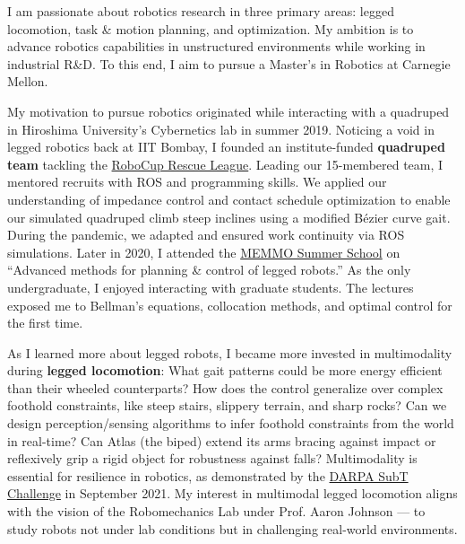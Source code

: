 \documentclass[12pt]{article}
\newcommand{\makefootnotelist}[1]{%
	\parbox{0.8\textwidth} {%
		\footnotesize{%
			\renewcommand*{\do}[1]{##1\\}%
			\dolistcsloop{#1}}}}%
\newcommand{\fancyfootnote}[1]{%
	\footnotemark{}%
	\def\listname{footlist\thepage}%
	\def\n{$^{\the\numexpr\value{footnote}}$}
	\ifcsdef{\listname}%
	{\listcseadd{\listname}{\n\ #1}}%
	{\csedef{\listname}{}%
		\listcseadd{\listname}{\n\ #1}}%
	\fancypagestyle{fancyfootnote}{%
		\fancyfoot[L]{\makefootnotelist{\listname}}%
		\fancyfoot[R]{Page \thepage}%
		\fancyfoot[C]{}%
	}\thispagestyle{fancyfootnote}}%
\begin{document}



I am passionate about robotics research in three primary areas: legged locomotion, task \& motion planning, and optimization. My ambition is to advance robotics capabilities in unstructured environments while working in industrial R\&D. To this end, I aim to pursue a Master’s in Robotics at Carnegie Mellon.

My motivation to pursue robotics originated while interacting with a quadruped in Hiroshima University’s Cybernetics lab in summer 2019. Noticing a void in legged robotics back at IIT Bombay, I founded an institute-funded \textbf{quadruped team} tackling the \href{https://rrl.robocup.org/}{RoboCup Rescue League}. Leading our 15-membered team, I mentored recruits with ROS and programming skills. We applied our understanding of impedance control and contact schedule optimization to enable our simulated quadruped climb steep inclines using a modified Bézier curve gait. During the pandemic, we adapted and ensured work continuity via ROS simulations. Later in 2020, I attended the \href{https://memory-of-motion.github.io/summer-school/}{MEMMO Summer School} on “Advanced methods for planning \& control of legged robots.” As the only undergraduate, I enjoyed interacting with graduate students. The lectures exposed me to Bellman’s equations, collocation methods, and optimal control for the first time.

As I learned more about legged robots, I became more invested in multimodality during \textbf{legged locomotion}: What gait patterns could be more energy efficient than their wheeled counterparts? How does the control generalize over complex foothold constraints, like steep stairs, slippery terrain, and sharp rocks? Can we design perception/sensing algorithms to infer foothold constraints from the world in real-time? Can Atlas (the biped) extend its arms bracing against impact or reflexively grip a rigid object for robustness against falls? Multimodality is essential for resilience in robotics, as demonstrated by the \href{https://www.darpa.mil/program/darpa-subterranean-challenge}{DARPA SubT Challenge} in September 2021. My interest in multimodal legged locomotion aligns with the vision of the Robomechanics Lab under Prof. Aaron Johnson — to study robots not under lab conditions but in challenging real-world environments.
\end{document}
